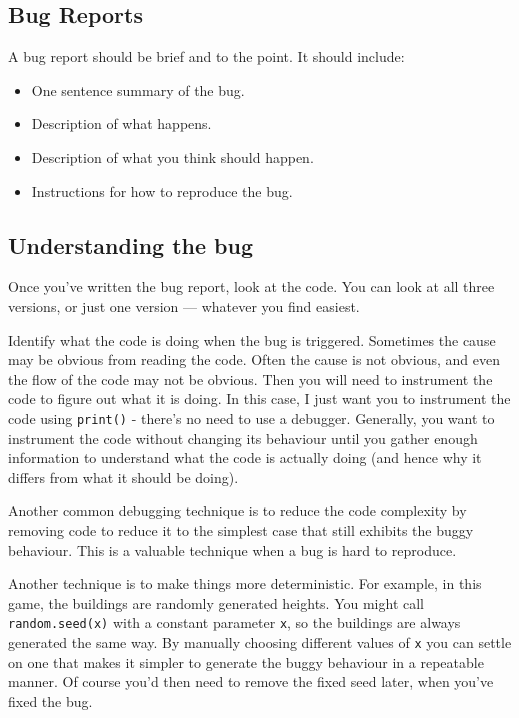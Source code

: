 \documentclass{article}
\begin{document}
\subsection*{Bug Reports}

A bug report should be brief and to the point.  It should include:
\begin{itemize}
\item One sentence summary of the bug.
\item Description of what happens.
\item Description of what you think should happen.
\item Instructions for how to reproduce the bug.
\end{itemize}

\subsection*{Understanding the bug}

Once you've written the bug report, look at the code.  You can look at
all three versions, or just one version --- whatever you find easiest.

Identify what the code is doing when the bug is triggered.  Sometimes
the cause may be obvious from reading the code.  Often the cause is
not obvious, and even the flow of the code may not be obvious.  Then
you will need to instrument the code to figure out what it is doing.
In this case, I just want you to instrument the code using
\texttt{print()} - there's no need to use a debugger.  Generally, you
want to instrument the code without changing its behaviour until you
gather enough information to understand what the code is actually
doing (and hence why it differs from what it should be doing).

Another common debugging technique is to reduce the code complexity by
removing code to reduce it to the simplest case that still exhibits
the buggy behaviour.  This is a valuable technique when a bug is hard
to reproduce.

Another technique is to make things more deterministic.  For example,
in this game, the buildings are randomly generated heights.  You might
call \texttt{random.seed(x)} with a constant parameter \texttt{x}, so
the buildings are always generated the same way.  By manually choosing
different values of \texttt{x} you can settle on one that makes it
simpler to generate the buggy behaviour in a repeatable manner.  Of
course you'd then need to remove the fixed seed later, when you've fixed
the bug.
\end{document}

